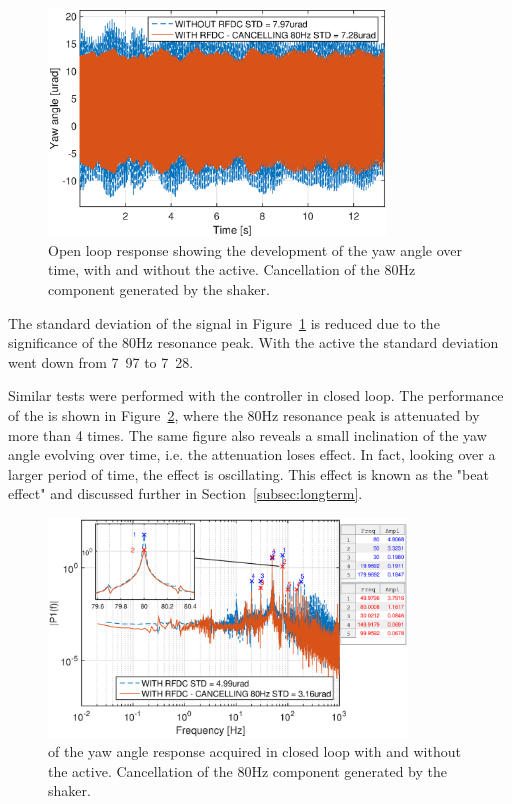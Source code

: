 \begin{figure}[h!]
  \centering %
  \includegraphics[width=0.8\textwidth, trim=0cm 0cm 0cm 0.7cm, clip=true]{fig/matlab/yl_openloop_ext_disturbance_80Hz}
  \caption{\label{fig:yl_openloop_80} Open loop response showing the development of the yaw angle over time, with and without the \abbrRFDC active. Cancellation of the 80Hz component generated by the shaker.}
\end{figure}

The standard deviation of the signal in Figure~\ref{fig:yl_openloop_80} is reduced due to the significance of the 80Hz resonance peak. With the \abbrRFDC active the standard deviation went down from \unit{7.97}{\micro\radian} to \unit{7.28}{\micro\radian}.

Similar tests were performed with the controller in closed loop. The performance of the \abbrRFDC is shown in Figure~\ref{fig:fft_closedloop_80}, where the 80Hz resonance peak is attenuated by more than 4 times. The same figure also reveals a small inclination of the yaw angle evolving over time, i.e. the attenuation loses effect. In fact, looking over a larger period of time, the effect is oscillating. This effect is known as the "beat effect" and discussed further in Section~\ref{subsec:longterm}.

\begin{figure}[h]
  \centering %
  \includegraphics[width=0.85\textwidth]{fig/matlab/fft_closedloop_ext_disturbance_80Hz_with_zoom_2}
  \caption{\label{fig:fft_closedloop_80} \abbrFFT of the yaw angle response acquired in closed loop with and without the \abbrRFDC active. Cancellation of the 80Hz component generated by the shaker.}
\end{figure}

